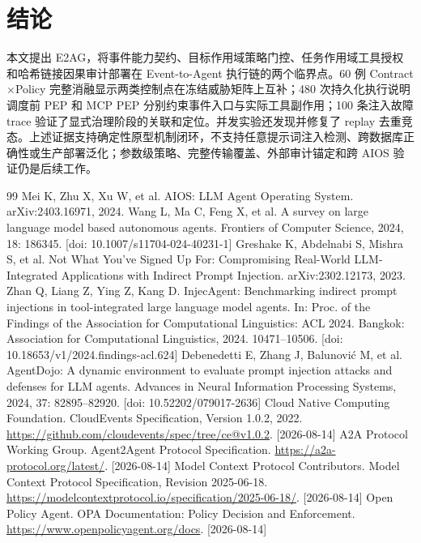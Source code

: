 \section{结论}\label{sec:conclusion}

本文提出 E2AG，将事件能力契约、目标作用域策略门控、任务作用域工具授权和哈希链接因果审计部署在 Event-to-Agent 执行链的两个临界点。60 例 Contract$\times$Policy 完整消融显示两类控制点在冻结威胁矩阵上互补；480 次持久化执行说明调度前 PEP 和 MCP PEP 分别约束事件入口与实际工具副作用；100 条注入故障 trace 验证了显式治理阶段的关联和定位。并发实验还发现并修复了 replay 去重竞态。上述证据支持确定性原型机制闭环，不支持任意提示词注入检测、跨数据库正确性或生产部署泛化；参数级策略、完整传输覆盖、外部审计锚定和跨 AIOS 验证仍是后续工作。

{\scriptsize
\begin{thebibliography}{99}
\setlength{\itemsep}{0pt}
\setlength{\parskip}{0pt}
 Mei K, Zhu X, Xu W, et al. AIOS: LLM Agent Operating System. arXiv:2403.16971, 2024.
 Wang L, Ma C, Feng X, et al. A survey on large language model based autonomous agents. Frontiers of Computer Science, 2024, 18: 186345. [doi: 10.1007/s11704-024-40231-1]
 Greshake K, Abdelnabi S, Mishra S, et al. Not What You've Signed Up For: Compromising Real-World LLM-Integrated Applications with Indirect Prompt Injection. arXiv:2302.12173, 2023.
 Zhan Q, Liang Z, Ying Z, Kang D. InjecAgent: Benchmarking indirect prompt injections in tool-integrated large language model agents. In: Proc. of the Findings of the Association for Computational Linguistics: ACL 2024. Bangkok: Association for Computational Linguistics, 2024. 10471--10506. [doi: 10.18653/v1/2024.findings-acl.624]
 Debenedetti E, Zhang J, Balunovi\'{c} M, et al. AgentDojo: A dynamic environment to evaluate prompt injection attacks and defenses for LLM agents. Advances in Neural Information Processing Systems, 2024, 37: 82895--82920. [doi: 10.52202/079017-2636]
 Cloud Native Computing Foundation. CloudEvents Specification, Version 1.0.2, 2022. \url{https://github.com/cloudevents/spec/tree/ce@v1.0.2}. [2026-08-14]
 A2A Protocol Working Group. Agent2Agent Protocol Specification. \url{https://a2a-protocol.org/latest/}. [2026-08-14]
 Model Context Protocol Contributors. Model Context Protocol Specification, Revision 2025-06-18. \url{https://modelcontextprotocol.io/specification/2025-06-18/}. [2026-08-14]
 Open Policy Agent. OPA Documentation: Policy Decision and Enforcement. \url{https://www.openpolicyagent.org/docs}. [2026-08-14]

\end{thebibliography}}
